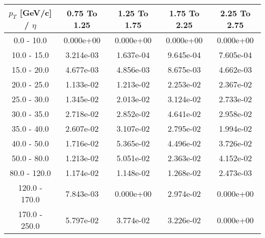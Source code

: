 \begin{tabular}{|c|c|c|c|c|}\hline 
$p_T$ [GeV/c] / $\eta$  & 0.75 To 1.25 & 1.25 To 1.75 & 1.75 To 2.25 & 2.25 To 2.75 \\ 
 \hline 
0.0 - 10.0 & 0.000e+00 & 0.000e+00 & 0.000e+00 & 0.000e+00 \\ 
10.0 - 15.0 & 3.214e-03 & 1.637e-04 & 9.645e-04 & 7.605e-04 \\ 
15.0 - 20.0 & 4.677e-03 & 4.856e-03 & 8.675e-03 & 4.662e-03 \\ 
20.0 - 25.0 & 1.133e-02 & 1.213e-02 & 2.253e-02 & 2.367e-02 \\ 
25.0 - 30.0 & 1.345e-02 & 2.013e-02 & 3.124e-02 & 2.733e-02 \\ 
30.0 - 35.0 & 2.718e-02 & 2.852e-02 & 4.641e-02 & 2.958e-02 \\ 
35.0 - 40.0 & 2.607e-02 & 3.107e-02 & 2.795e-02 & 1.994e-02 \\ 
40.0 - 50.0 & 1.716e-02 & 5.365e-02 & 4.496e-02 & 3.726e-02 \\ 
50.0 - 80.0 & 1.213e-02 & 5.051e-02 & 2.363e-02 & 4.152e-02 \\ 
80.0 - 120.0 & 1.174e-02 & 1.148e-02 & 1.268e-02 & 2.473e-03 \\ 
120.0 - 170.0 & 7.843e-03 & 0.000e+00 & 2.974e-02 & 0.000e+00 \\ 
170.0 - 250.0 & 5.797e-02 & 3.774e-02 & 3.226e-02 & 0.000e+00 \\ 
 \hline 
\end{tabular} 
